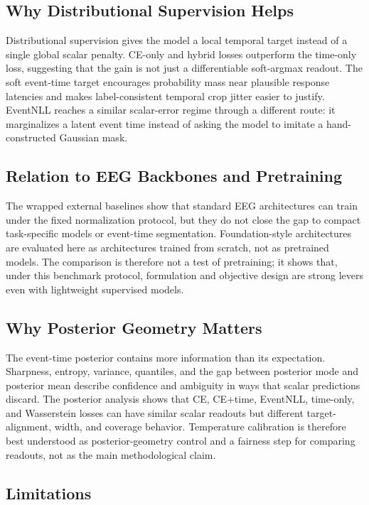 \documentclass[12pt]{article}
\begin{document}
\subsection{Why Distributional Supervision Helps}

Distributional supervision gives the model a local temporal target instead of a single global scalar penalty. CE-only and hybrid losses outperform the time-only loss, suggesting that the gain is not just a differentiable soft-argmax readout. The soft event-time target encourages probability mass near plausible response latencies and makes label-consistent temporal crop jitter easier to justify. EventNLL reaches a similar scalar-error regime through a different route: it marginalizes a latent event time instead of asking the model to imitate a hand-constructed Gaussian mask.

\subsection{Relation to EEG Backbones and Pretraining}

The wrapped external baselines show that standard EEG architectures can train under the fixed normalization protocol, but they do not close the gap to compact task-specific models or event-time segmentation. Foundation-style architectures are evaluated here as architectures trained from scratch, not as pretrained models. The comparison is therefore not a test of pretraining; it shows that, under this benchmark protocol, formulation and objective design are strong levers even with lightweight supervised models.

\subsection{Why Posterior Geometry Matters}

The event-time posterior contains more information than its expectation. Sharpness, entropy, variance, quantiles, and the gap between posterior mode and posterior mean describe confidence and ambiguity in ways that scalar predictions discard. The posterior analysis shows that CE, CE+time, EventNLL, time-only, and Wasserstein losses can have similar scalar readouts but different target-alignment, width, and coverage behavior. Temperature calibration is therefore best understood as posterior-geometry control and a fairness step for comparing readouts, not as the main methodological claim.

\subsection{Limitations}
\end{document}
